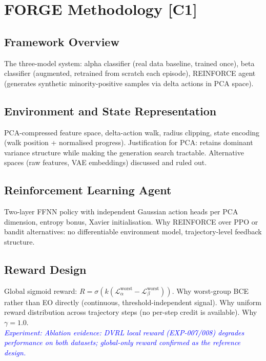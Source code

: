 \documentclass[12pt]{article}
\newcommand{\experiment}[1]{\textcolor{blue}{\textit{Experiment: #1}}}
\newcommand{\contrib}[1]{\textbf{[#1]}}
\begin{document}
\section{FORGE Methodology \contrib{C1}}

\subsection{Framework Overview}
The three-model system: alpha classifier (real data baseline, trained once),
beta classifier (augmented, retrained from scratch each episode), REINFORCE
agent (generates synthetic minority-positive samples via delta actions in PCA
space).

\subsection{Environment and State Representation}
PCA-compressed feature space, delta-action walk, radius clipping, state
encoding (walk position + normalised progress). Justification for PCA:
retains dominant variance structure while making the generation search
tractable. Alternative spaces (raw features, VAE embeddings) discussed and
ruled out.

\subsection{Reinforcement Learning Agent}
Two-layer FFNN policy with independent Gaussian action heads per PCA
dimension, entropy bonus, Xavier initialisation. Why REINFORCE over PPO or
bandit alternatives: no differentiable environment model, trajectory-level
feedback structure.

\subsection{Reward Design}
Global sigmoid reward: $R = \sigma\!\left(k(\mathcal{L}^\text{worst}_\alpha -
\mathcal{L}^\text{worst}_\beta)\right)$. Why worst-group BCE rather than EO
directly (continuous, threshold-independent signal). Why uniform reward
distribution across trajectory steps (no per-step credit is available). Why
$\gamma = 1.0$. \\
\experiment{Ablation evidence: DVRL local reward (EXP-007/008) degrades
performance on both datasets; global-only reward confirmed as the reference
design.}
\end{document}
